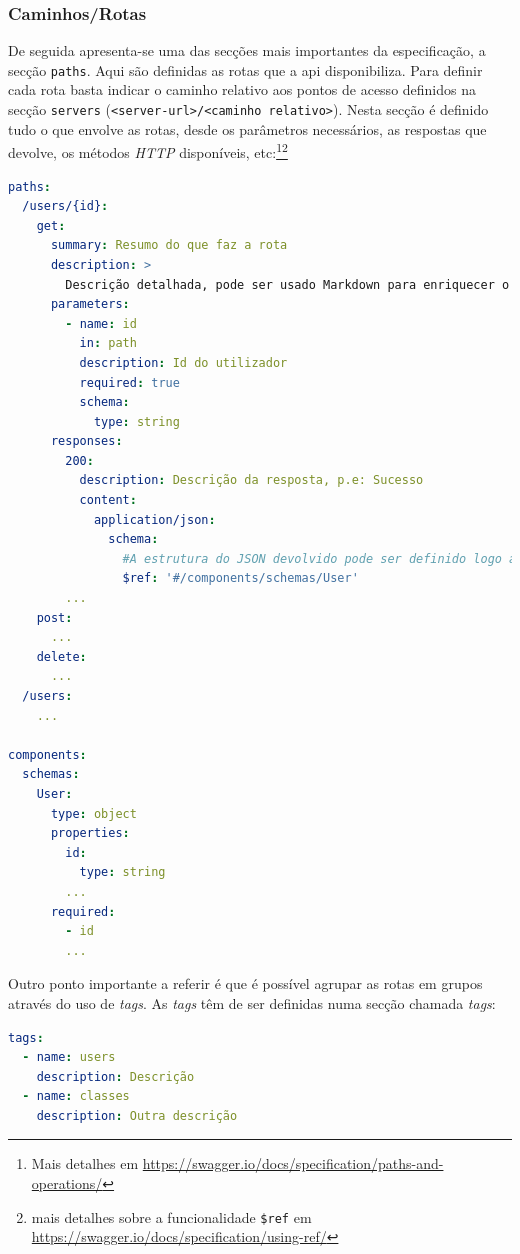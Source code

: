 \subsubsection{Caminhos/Rotas}
De seguida apresenta-se uma das secções mais importantes da especificação, a secção \texttt{paths}. 
Aqui são definidas as rotas que a \acrshort{api} disponibiliza. Para definir cada rota basta indicar o caminho 
relativo aos pontos de acesso definidos na secção \texttt{servers} (\verb|<server-url>/<caminho relativo>|). 
Nesta secção é definido tudo o que envolve as rotas, desde os parâmetros necessários, as respostas que devolve, 
os métodos \textit{HTTP} disponíveis, etc:\footnote{Mais detalhes em \url{https://swagger.io/docs/specification/paths-and-operations/}}\footnote{mais detalhes sobre a funcionalidade \texttt{\$ref} em \url{https://swagger.io/docs/specification/using-ref/}}
\begin{lstlisting}[language=yaml, caption=Exemplo de secção \texttt{paths} indicando os detalhes de cada rota na especificação \textit{OpenAPI}, label={exem:oapiRota}]
paths:
  /users/{id}:
    get:
      summary: Resumo do que faz a rota
      description: >
        Descrição detalhada, pode ser usado Markdown para enriquecer o texto
      parameters:
        - name: id
          in: path
          description: Id do utilizador
          required: true
          schema:
            type: string
      responses:
        200:
          description: Descrição da resposta, p.e: Sucesso
          content:
            application/json:
              schema:
                #A estrutura do JSON devolvido pode ser definido logo aqui ou num componente à parte, fazendo referência desse. Iremos aplicar o segundo caso para demonstrar que estas funcionalidades tornam a documentação mais fácil de manter
                $ref: '#/components/schemas/User'
        ...
    post:
      ...
    delete:
      ...
  /users:
    ...

components:
  schemas:
    User:
      type: object
      properties:
        id:
          type: string
        ...
      required:
        - id
        ...
\end{lstlisting}

Outro ponto importante a referir é que é possível agrupar as rotas em grupos através do uso de \textit{tags}. 
As \textit{tags} têm de ser definidas numa secção chamada \textit{tags}:
\begin{lstlisting}[language=yaml, caption={Exemplo de secção \texttt{tags} definindo tags na especificação \textit{OpenAPI}}]
tags:
  - name: users
    description: Descrição
  - name: classes
    description: Outra descrição
\end{lstlisting}


